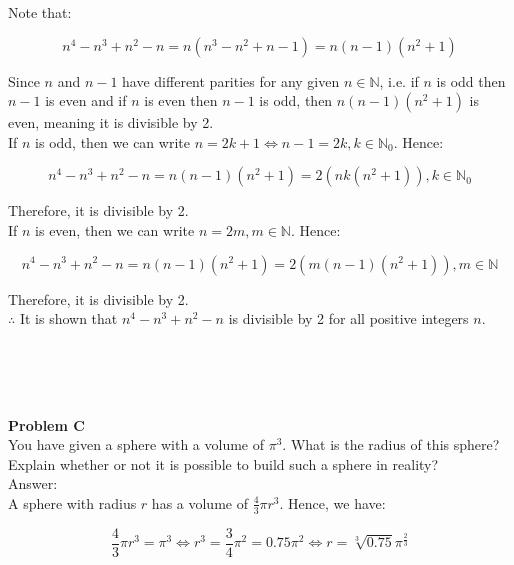 \documentclass[12pt, letterpaper]{report}
\begin{document}
Note that:

\begin{equation*}
n^4 - n^3 + n^2 - n = n(n^3 - n^2 + n - 1) = n(n - 1)(n^2 + 1)
\end{equation*}

\bigskip

Since $n$ and $n - 1$ have different parities for any given $n\in\mathbb{N}$, i.e. if $n$ is odd then $n - 1$ is even and if $n$ is even then $n - 1$ is odd, then $n(n - 1)(n^2 + 1)$ is even, meaning it is divisible by 2.\\

If $n$ is odd, then we can write $n = 2k + 1 \Leftrightarrow n - 1 = 2k, k\in\mathbb{N}_0$. Hence:

\begin{equation*}
n^4 - n^3 + n^2 - n = n(n - 1)(n^2 + 1) = 2(nk(n^2 + 1)), k\in\mathbb{N}_0
\end{equation*}

Therefore, it is divisible by 2.\\

If $n$ is even, then we can write $n = 2m, m\in\mathbb{N}$. Hence:

\begin{equation*}
n^4 - n^3 + n^2 - n = n(n - 1)(n^2 + 1) = 2(m(n - 1)(n^2 + 1)), m\in\mathbb{N}
\end{equation*}

Therefore, it is divisible by 2.\\

$\therefore$ It is shown that $n^4 - n^3 + n^2 - n$ is divisible by 2 for all positive integers $n$.

\makebox[\linewidth]{\rule{\textwidth}{0.4pt}}\\

\newpage

\makebox[\linewidth]{\rule{\textwidth}{0.4pt}}\\
\\\textbf{Problem C}\\
You have given a sphere with a volume of $\pi^3$. What is the radius of this sphere?\\
Explain whether or not it is possible to build such a sphere in reality?\\

Answer:\\
A sphere with radius $r$ has a volume of $\frac{4}{3}\pi r^3$. Hence, we have:

\begin{equation*}
\frac{4}{3}\pi r^3 = \pi^3 \Leftrightarrow r^3 = \frac{3}{4}\pi^2 = 0.75\pi^2 \Leftrightarrow r = \sqrt[3]{0.75}\pi^{\frac{2}{3}}
\end{equation*}
\end{document}

